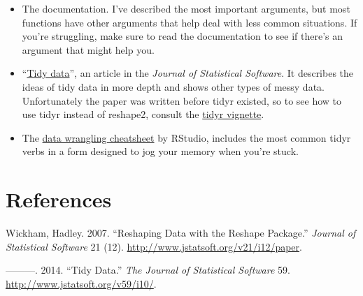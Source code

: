 \begin{itemize}
\item
  The documentation. I've described the most important arguments, but
  most functions have other arguments that help deal with less common
  situations. If you're struggling, make sure to read the documentation
  to see if there's an argument that might help you.
\item
  ``\href{http://www.jstatsoft.org/v59/i10/}{Tidy data}'', an article in
  the \emph{Journal of Statistical Software}. It describes the ideas of
  tidy data in more depth and shows other types of messy data.
  Unfortunately the paper was written before tidyr existed, so to see
  how to use tidyr instead of reshape2, consult the
  \href{http://cran.r-project.org/web/packages/tidyr/vignettes/tidy-data.html}{tidyr
  vignette}.
\item
  The \href{http://rstudio.com/cheatsheets}{data wrangling cheatsheet}
  by RStudio, includes the most common tidyr verbs in a form designed to
  jog your memory when you're stuck.
\end{itemize}

\section*{References}

Wickham, Hadley. 2007. ``Reshaping Data with the Reshape Package.''
\emph{Journal of Statistical Software} 21 (12).
\url{http://www.jstatsoft.org/v21/i12/paper}.

---------. 2014. ``Tidy Data.'' \emph{The Journal of Statistical
Software} 59. \url{http://www.jstatsoft.org/v59/i10/}.
